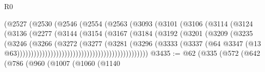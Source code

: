 \begin{lexlean}{R0}
\begin{coremodule}
                                      (@2527
                                        (@2530
                                          (@2546
                                            (@2554
                                              (@2563
                                                (@3093
                                                  (@3101
                                                    (@3106
                                                      (@3114
                                                        (@3124
                                                          (@3136
                                                            (@2277
                                                              (@3144
                                                                (@3154
                                                                  (@3167
                                                                    (@3184
                                                                      (@3192
                                                                        (@3201
                                                                          (@3209
                                                                            (@3235
                                                                              (@3246
                                                                                (@3266
                                                                                  (@3272
                                                                                    (@3277
                                                                                      (@3281
                                                                                        (@3296
                                                                                          (@3333
                                                                                            (@3337
                                                                                              (@64
                                                                                                @3347
                                                                                                (@13
                                                                                                  @63)))))))))))))))))))))))))))))))))))))))))))))))
@3435 := @62
    (@335
      (@572
        (@642
          (@786
            (@960
              (@1007
                (@1060
                  (@1140

\end{coremodule}
\end{lexlean}
